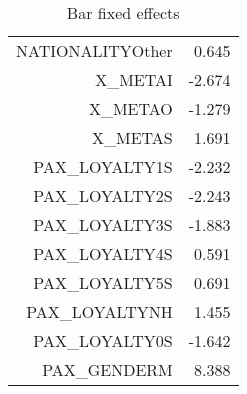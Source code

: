 \documentclass{article}
\begin{document}
\begin{table}[H]
\begin{tabular}{rr}
		NATIONALITYOther	  &       0.645             \\                          
		X\_METAI	                  &          -2.674         \\                              
		X\_METAO	                  &    -1.279               \\                        
		X\_METAS	                  &          1.691          \\                             
		PAX\_LOYALTY1S    	  &       -2.232            \\                           
		PAX\_LOYALTY2S    	  &       -2.243            \\                           
		PAX\_LOYALTY3S    	  &       -1.883            \\                           
		PAX\_LOYALTY4S    	  &       0.591             \\                          
		PAX\_LOYALTY5S    	  &       0.691             \\                          
		PAX\_LOYALTYNH    	  &       1.455             \\                          
		PAX\_LOYALTY0S	          &       -1.642            \\                           
		PAX\_GENDERM	          &        8.388            \\  
		\hline 
		\hline 
	\end{tabular}
	\caption{Bar fixed effects} 
\end{table}
\end{document}
